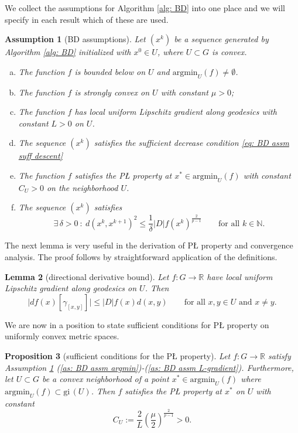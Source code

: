 \documentclass{article}
\theoremstyle{plain}\newtheorem{theorem}{Theorem}[section]
\theoremstyle{plain}\newtheorem{definition}[theorem]{Definition}
\theoremstyle{plain}\newtheorem{lemma}[theorem]{Lemma}
\theoremstyle{definition}\newtheorem{remark}[theorem]{Remark}
\theoremstyle{definition}\newtheorem{example}[theorem]{Example}
\theoremstyle{plain}\newtheorem{proposition}[theorem]{Proposition}
\theoremstyle{plain}\newtheorem{inference}[theorem]{Inference}
\theoremstyle{plain}\newtheorem{corollary}[theorem]{Corollary}
\theoremstyle{plain}\newtheorem{assumption}[theorem]{Assumption}
\newcommand{\bbR}{\mathbb{R}}
\newcommand{\bbN}{\mathbb{N}}
\begin{document}
We collect the assumptions for Algorithm \ref{alg: BD} into one place and we will specify in each result which of these are used.
\begin{assumption}[BD assumptions]\label{as: BD assm}
    Let $(x^k)$ be a sequence generated by Algorithm \ref{alg: BD} initialized with $x^0\in U$, where $U\subset G$ is convex.
    \begin{enumerate}[(a)]
        \item\label{as: BD assm argmin} The function $f$ is bounded below on $U$ and $\mathrm{argmin}_U(f)\neq\emptyset$.
        \item\label{as: BD assm mu-cvx} The function $f$ is strongly convex on $U$ with constant $\mu>0$;
        \item\label{as: BD assm L-gradient} The function $f$ has local uniform Lipschitz gradient along geodesics with constant $L>0$ on $U$.
        \item\label{as: BD assm suff descent} The sequence $(x^k)$ satisfies the sufficient decrease condition \eqref{eq: BD assm suff descent}
        \item\label{as: BD assm PL} The function $f$ satisfies the PŁ property at $x^*\in \mathrm{argmin}_U(f)$ with constant $C_U>0$ on the neighborhood $U$.
        \item\label{as: BD assm sl} The sequence $(x^k)$ satisfies
        \begin{equation}\label{eq: BD assm sl}
            \exists\,\delta>0 ~:~ d(x^k,x^{k+1})^2\leq\frac{1}{\delta}|D|f(x^k)^{\frac{2}{p-1}} \qquad\text{for all}\,\,k\in\bbN.
        \end{equation}
    \end{enumerate}
\end{assumption}
The next lemma is very useful in the derivation of PŁ property and convergence analysis.  The proof follows by straightforward application of the definitions.
\begin{lemma}[directional derivative bound]\label{lm: BD dir-dervt bound}
    Let $f:G\to\bbR$ have local uniform Lipschitz gradient along geodesics on $U$. Then
    \begin{equation}\label{eq: BD dir-dervt bound}
        \bigl|df(x)[\gamma_{[x,y]}]\bigr|\leq|D|f(x)d(x,y) \qquad\text{for all}\,\,x,y\in U\,\,\text{and}\,\,x\neq y.
    \end{equation}
\end{lemma}
We are now in a position to state sufficient conditions for PŁ property on uniformly convex metric spaces.
\begin{proposition}[sufficient conditions for the PŁ property]\label{pr: suff cond for PL}
    Let $f:G\to\bbR$ satisfy Assumption \ref{as: BD assm} (\ref{as: BD assm argmin})-(\ref{as: BD assm L-gradient}). Furthermore, let $U\subset G$ be a convex neighborhood of a point $x^*\in \mathrm{argmin}_U(f)$ where $\mathrm{argmin}_U(f)\subset\mathrm{gi}\,(U)$. Then $f$ satisfies the PŁ property at $x^*$ on $U$ with constant
    $$
    C_U:=\frac{2}{L}\left(\frac{\mu}{2}\right)^{\frac{2}{p-1}}>0.
    $$
\end{proposition}
\end{document}

